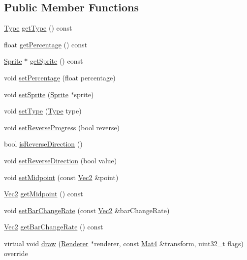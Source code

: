 \subsection*{Public Member Functions}
\begin{DoxyCompactItemize}
\item 
\hyperlink{classProgressTimer_a9638d092b86d51bce727621b1a70d32f}{Type} \hyperlink{classProgressTimer_a322177b2b80d358482270730ba811cbd}{get\+Type} () const
\item 
float \hyperlink{classProgressTimer_a446b52a689c8ea0f556f3c1b12eda7b8}{get\+Percentage} () const
\item 
\hyperlink{classSprite}{Sprite} $\ast$ \hyperlink{classProgressTimer_abf78b31860b22109143633f44508233f}{get\+Sprite} () const
\item 
void \hyperlink{classProgressTimer_a13901defa20b543b0d92bbf043215945}{set\+Percentage} (float percentage)
\item 
void \hyperlink{classProgressTimer_a3910e7c59c07732edcc2039dacbe7172}{set\+Sprite} (\hyperlink{classSprite}{Sprite} $\ast$sprite)
\item 
void \hyperlink{classProgressTimer_abe2478baf4201427691e7bd615151c19}{set\+Type} (\hyperlink{classProgressTimer_a9638d092b86d51bce727621b1a70d32f}{Type} type)
\item 
void \hyperlink{classProgressTimer_a59c9d45e3083b9af6e95b0138dae3fed}{set\+Reverse\+Progress} (bool reverse)
\item 
bool \hyperlink{classProgressTimer_a97b759861d5e2e32ff94833f23e24eb7}{is\+Reverse\+Direction} ()
\item 
void \hyperlink{classProgressTimer_a1bfa9056523c014a8453caf962a1e69c}{set\+Reverse\+Direction} (bool value)
\item 
void \hyperlink{classProgressTimer_a69680f76df01ea815970964cc1dc673b}{set\+Midpoint} (const \hyperlink{classVec2}{Vec2} \&point)
\item 
\hyperlink{classVec2}{Vec2} \hyperlink{classProgressTimer_a3b680cbc620a22d766aea62b518ef66f}{get\+Midpoint} () const
\item 
void \hyperlink{classProgressTimer_ac54f707a0291274c04e265b2898586d6}{set\+Bar\+Change\+Rate} (const \hyperlink{classVec2}{Vec2} \&bar\+Change\+Rate)
\item 
\hyperlink{classVec2}{Vec2} \hyperlink{classProgressTimer_a0f3e761df2dca3294dab8e553e19adfa}{get\+Bar\+Change\+Rate} () const
\item 
virtual void \hyperlink{classProgressTimer_aeff75c55be12ed0c7cc8893140c78de6}{draw} (\hyperlink{classRenderer}{Renderer} $\ast$renderer, const \hyperlink{classMat4}{Mat4} \&transform, uint32\+\_\+t flags) override

\end{DoxyCompactItemize}
